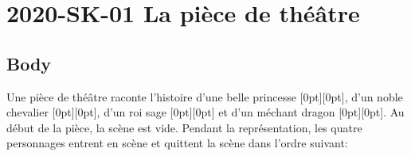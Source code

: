 \documentclass[a4paper,11pt]{report}
\newcommand{\taskGraphicsFolder}{..}
\begin{document}
\section*{\centering{} 2020-SK-01 La pièce de théâtre}


\subsection*{Body}

Une pièce de théâtre raconte l’histoire d’une belle princesse \raisebox{-0.5ex}[0pt][0pt]{}, d’un noble chevalier \raisebox{-0.5ex}[0pt][0pt]{}, d’un roi sage \raisebox{-0.5ex}[0pt][0pt]{} et d’un méchant dragon \raisebox{-0.5ex}[0pt][0pt]{}. Au début de la pièce, la scène est vide. Pendant la représentation, les quatre personnages entrent en scène et quittent la scène dans l’ordre suivant:
\end{document}
